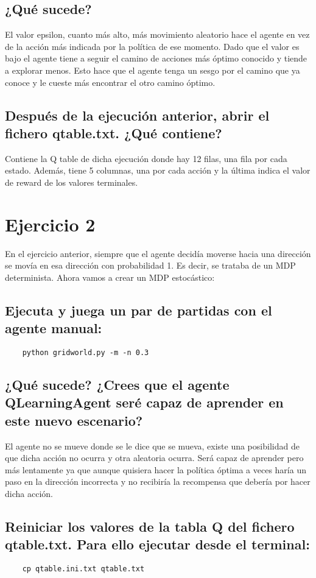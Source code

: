 \documentclass[12pt]{article}
\begin{document}
    \subsection*{¿Qué sucede?}
    El valor epsilon, cuanto más alto, más movimiento aleatorio hace el agente en vez de la acción más indicada por
    la política de ese momento. Dado que el valor es bajo el agente tiene a seguir el camino de acciones más óptimo
    conocido y tiende a explorar menos.
    Esto hace que el agente tenga un sesgo por el camino que ya conoce y le cueste más encontrar el otro camino óptimo.
    \subsection{Después de la ejecución anterior, abrir el fichero qtable.txt. ¿Qué contiene?}
    Contiene la Q table de dicha ejecución donde hay 12 filas, una fila por cada estado. Además, tiene 5 columnas,
    una por cada acción y la última indica el valor de reward de los valores terminales.

    \section*{Ejercicio 2}
    En el ejercicio anterior, siempre que el agente decidía moverse hacia una dirección se movía en esa dirección
    con probabilidad 1. Es decir, se trataba de un MDP determinista. Ahora vamos a crear un MDP estocástico:
    \subsection{Ejecuta y juega un par de partidas con el agente manual:}
    \begin{verbatim}
    python gridworld.py -m -n 0.3
    \end{verbatim}
    \subsection*{¿Qué sucede? ¿Crees que el agente QLearningAgent seré capaz de aprender en este nuevo escenario?}
    El agente no se mueve donde se le dice que se mueva, existe una posibilidad de que dicha acción no ocurra y otra
    aleatoria ocurra.
    Será capaz de aprender pero más lentamente ya que aunque quisiera hacer la política óptima a veces haría un paso
    en la dirección incorrecta y no recibiría la recompensa que debería por hacer dicha acción.
    \subsection{Reiniciar los valores de la tabla Q del fichero qtable.txt. Para ello ejecutar desde el terminal:}
    \begin{verbatim}
    cp qtable.ini.txt qtable.txt
    \end{verbatim}
\end{document}
